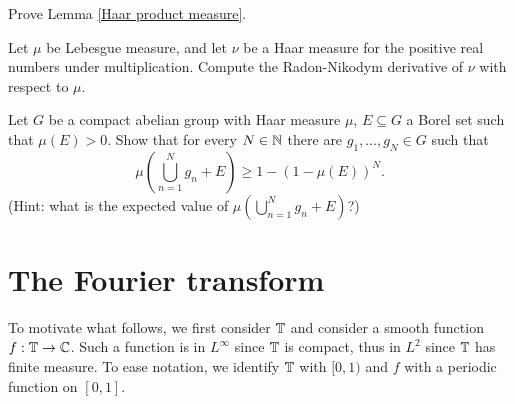 \begin{exercise}
\label{Haar product measure exercise}
Prove Lemma \ref{Haar product measure}.
\end{exercise}

\begin{exercise}
Let $\mu$ be Lebesgue measure, and let $\nu$ be a Haar measure for the positive real numbers under multiplication.
Compute the Radon-Nikodym derivative of $\nu$ with respect to $\mu$.
\end{exercise}

\begin{exercise}
Let $G$ be a compact abelian group with Haar measure $\mu$, $E \subseteq G$ a Borel set such that $\mu(E) > 0$.
Show that for every $N \in \mathbb{N}$ there are $g_1, \dots, g_{N} \in G$ such that
\[\mu\left(\bigcup_{n=1}^{N} g_{n} + E\right) \geq 1 - (1 - \mu(E))^N.\]
(Hint: what is the expected value of $\mu\left(\bigcup_{n=1}^{N} g_{n} + E\right)$?)
\end{exercise}

\section{The Fourier transform}
To motivate what follows, we first consider $\mathbb{T}$ and consider a smooth function $f: \mathbb{T} \to \mathbb{C}$.
Such a function is in $L^\infty$ since $\mathbb{T}$ is compact, thus in $L^2$ since $\mathbb{T}$ has finite measure.
To ease notation, we identify $\mathbb{T}$ with $[0, 1)$ and $f$ with a periodic function on $[0, 1]$.

